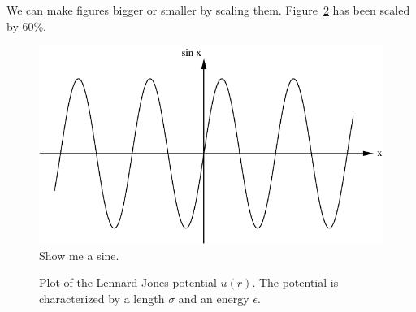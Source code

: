 \documentclass[prb,12pt]{revtex4}
\begin{document}
We can make figures bigger or smaller by scaling them. Figure~\ref{fig:lj}
has been scaled by 60\%.

\begin{figure}[h]
\begin{center}
\includegraphics{figures/sine}
\caption{\label{fig:typical}Show me a sine.}
\end{center}
\end{figure}

\begin{figure}[h]
\begin{center}
\caption{\label{fig:lj}Plot of the
Lennard-Jones potential
$u(r)$. The potential is characterized by a length
$\sigma$ and an energy
$\epsilon$.}
\end{center}
\end{figure}
\end{document}
